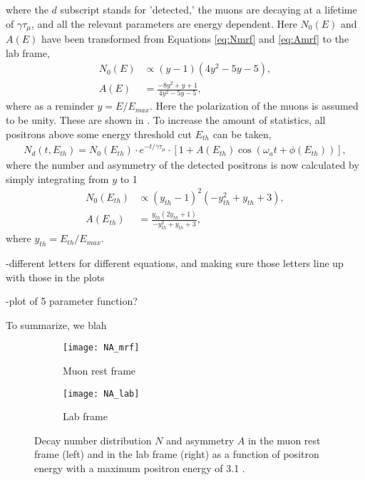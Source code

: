 where the $d$ subscript stands for 'detected,' the muons are decaying at a lifetime of $\gamma\tau_{\mu}$, and all the relevant parameters are energy dependent. Here $N_{0}(E)$ and $A(E)$ have been transformed from Equations \ref{eq:Nmrf} and \ref{eq:Amrf} to the lab frame,
        \begin{align}
            N_{0}(E) &\propto (y-1)(4y^{2}-5y-5), \label{eq:Nlab} \\
            A(E) &= \frac{-8y^{2}+y+1}{4y^{2}-5y-5}, \label{eq:Alab}
        \end{align}
where as a reminder $y=E/E_{max}$. Here the polarization of the muons is assumed to be unity. These are shown in . To increase the amount of statistics, all positrons above some energy threshold cut $E_{th}$ can be taken,
        \begin{align} \label{eq:diffdecaydist}
            N_{d}(t, E_{th}) = N_{0}(E_{th}) \cdot e^{-t/\gamma\tau_{\mu}} \cdot [1 + A(E_{th}) \cos(\omega_{a}t+\phi(E_{th}))],
        \end{align}
where the number and asymmetry of the detected positrons is now calculated by simply integrating from $y$ to 1
        \begin{align}
            N_{0}(E_{th}) &\propto (y_{th}-1)^{2}(-y_{th}^{2}+y_{th}+3), \label{eq:Nth} \\
            A(E_{th}) &= \frac{y_{th}(2y_{th}+1)}{-y_{th}^{2}+y_{th}+3}, \label{eq:Ath}
        \end{align}
where $y_{th}=E_{th}/E_{max}$.



-different letters for different equations, and making sure those letters line up with those in the plots


-plot of 5 parameter function?


To summarize, we blah




\begin{figure}[]
\centering
    \begin{subfigure}[]{0.45\textwidth}
        \centering
        \texttt{[image: NA\_mrf]}
        \caption{Muon rest frame}
    \label{fig:NA2mrf}
    \end{subfigure}%
    \hspace{1cm}
    \begin{subfigure}[]{0.45\textwidth}
        \centering
        \texttt{[image: NA\_lab]}
        \caption{Lab frame}
    \label{fig:NA2lab}    
    \end{subfigure}
\caption[Number distribution and asymmetry for muon decay in the muon rest frame and lab frame]{Decay number distribution $N$ and asymmetry $A$ in the muon rest frame (left) and in the lab frame (right) as a function of positron energy with a maximum positron energy of 3.1 \GeV.}
\label{fig:NA2}
\end{figure}






